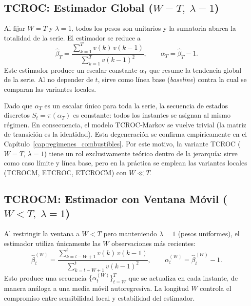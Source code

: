 \subsection{TCROC: Estimador Global
(\texorpdfstring{$W=T,\;\lambda=1$}{W=T, lambda=1})}

Al fijar $W = T$ y $\lambda = 1$, todos los pesos son unitarios
y la sumatoria abarca la totalidad de la serie.  El estimador se
reduce a
\begin{equation}
\hat{\beta}_T = \frac{\sum_{k=1}^{T} v(k)\, v(k-1)}
                    {\sum_{k=1}^{T} v(k-1)^2},
\qquad \alpha_T = \hat{\beta}_T - 1.
\label{eq:tcroc_global}
\end{equation}
Este estimador produce un escalar constante $\alpha_T$ que resume
la tendencia global de la serie.  Al no depender de $t$, sirve
como línea base (\textit{baseline}) contra la cual se comparan las
variantes locales.

\begin{remark}
\label{rem:degeneracion_tcroc}
Dado que $\alpha_T$ es un escalar único para toda la serie, la
secuencia de estados discretos $S_t = \pi(\alpha_T)$ es constante:
todos los instantes se asignan al mismo régimen.  En consecuencia,
el modelo TCROC-Markov se vuelve trivial (la matriz de transición es
la identidad).  Esta degeneración se confirma empíricamente
en el Capítulo~\ref{cap:regimenes_combustibles}.  Por este
motivo, la variante TCROC ($W = T$, $\lambda = 1$) tiene un
rol exclusivamente teórico dentro de la jerarquía: sirve como
caso límite y línea base, pero en la práctica se emplean las
variantes locales (TCROCM, ETCROC, ETCROCM) con $W \ll T$.
\end{remark}

\subsection{TCROCM: Estimador con Ventana Móvil
(\texorpdfstring{$W<T,\;\lambda=1$}{W<T, lambda=1})}

Al restringir la ventana a $W < T$ pero manteniendo $\lambda = 1$
(pesos uniformes), el estimador utiliza únicamente las $W$
observaciones más recientes:
\begin{equation}
\hat{\beta}_{t}^{(W)} = \frac{\sum_{k=t-W+1}^{t} v(k)\, v(k-1)}
                            {\sum_{k=t-W+1}^{t} v(k-1)^2},
\qquad \alpha_t^{(W)} = \hat{\beta}_{t}^{(W)} - 1.
\label{eq:tcrocm}
\end{equation}
Esto produce una secuencia $\{\alpha_t^{(W)}\}_{t=W}^{T}$ que se
actualiza en cada instante, de manera análoga a una media móvil
autoregresiva.  La longitud $W$ controla el compromiso entre
sensibilidad local y estabilidad del estimador.


